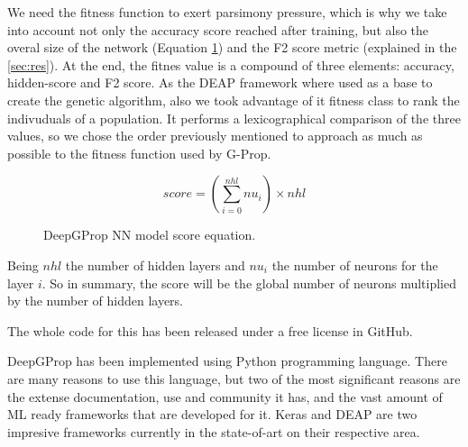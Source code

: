 \documentclass[runningheads]{llncs}
\begin{document}
\begin{itemize}
\end{itemize}

We need the fitness function to exert parsimony pressure, which is why
we take into account not only the accuracy score reached after
training, but also the overal size of the network (Equation
\ref{eq:hidden-score}) and the F2 score metric (explained in the
\autoref{sec:res}). At the end, the fitnes value is a compound of
three elements: accuracy, hidden-score and F2 score. As the DEAP framework
\cite{deap-ga} where used as a base to create the genetic algorithm, also we
took advantage of it fitness class \cite{deap-fitness} to rank the indivuduals
of a population. It performs a lexicographical comparison of the three values,
so we chose the order previously mentioned to approach as much as possible to
the fitness function used by G-Prop.


\begin{figure}
    \centering
    \caption{
        DeepGProp NN model score equation.
    }
    \label{eq:hidden-score}
    \begin{equation}
        score = (\sum_{i=0}^{nhl} nu_{i}) \times nhl
    \end{equation}
\end{figure}

Being $nhl$ the number of hidden layers and $nu_{i}$ the number
of neurons for the layer $i$. So in summary, the score will be the
global number of neurons multiplied by the number of hidden layers.

The whole code for this has been released under a free license in
GitHub. %

DeepGProp has been implemented using Python programming language. There are
many reasons to use this language, but two of the most significant reasons are
the extense documentation, use and community it has, and the vast amount of
ML ready frameworks that are developed for it. Keras and DEAP are two impresive
frameworks currently in the state-of-art on their respective area.
\end{document}
